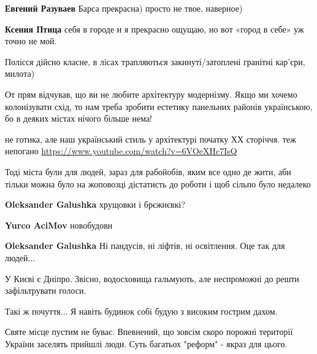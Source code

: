 \begin{itemize}
\begin{itemize}
\textbf{Евгений Разуваев} Барса прекрасна) просто не твое, наверное)

\textbf{Ксения Птица} себя в городе и я прекрасно ощущаю, но вот «город в себе» уж точно не мой.
\end{itemize} %

Полісся дійсно класне, в лісах трапляються закинуті/затоплені гранітні кар’єри, милота)

От прям відчував, що ви не любите архітектуру модернізму. Якщо ми хочемо колонізувати схід, то нам треба зробити естетику панельних районів українською, бо в деяких містах нічого більше нема!

не готика, але наш український стиль у архітектурі початку ХХ сторіччя. теж непогано \url{https://www.youtube.com/watch?v=6VOeXHc7IsQ}

Тоді міста були для людей, зараз для рабойобів, яким все одно де жити, аби тільки можна було на жоповозці дістатисть до роботи і щоб сільпо було недалеко

\begin{itemize} %
\textbf{Oleksander Galushka} хрущовки і брєжнєвкі?

\textbf{Yurco AciMov} новобудови

\textbf{Oleksander Galushka} Ні пандусів, ні ліфтів, ні освітлення. Оце так для людей...
\end{itemize} %

У Києві є Дніпро. Звісно, водосховища гальмують, але неспроможні до решти зафільтрувати голоси.

Такі ж почуття... Я навіть будинок собі будую з високим гострим дахом.

Святе місце пустим не буває. Впевнений, що зовсім скоро порожні території України заселять прийшлі люди. Суть багатьох "реформ" - якраз для цього.

\end{itemize} %
